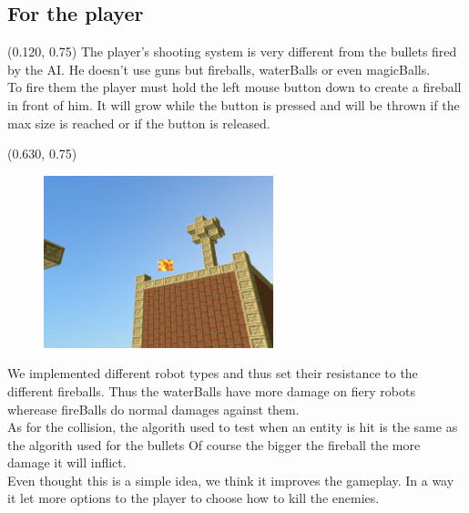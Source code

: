 \documentclass[article]{report}             %
\begin{document}
				\subsection{For the player}
				\begin{textblock}{0.508}(0.120, 0.75)
					The player's shooting system is very different from the bullets fired by the AI. He doesn't use guns but fireballs, waterBalls or even magicBalls. \\

					To fire them the player must hold the left mouse button down to create a fireball in front of him.
 				It will grow while the button is pressed and will be thrown if the max size is reached or if the button is released.\\
				\end{textblock}

				\begin{textblock}{0.628}(0.630, 0.75)
					\begin{figure}
						\includegraphics[height = 5cm]{images/Fireball.png}
					\end{figure}
				\end{textblock}
\newpage

					We implemented different robot types and thus set their resistance to the different fireballs. Thus the waterBalls have more damage on fiery robots wherease fireBalls do normal damages against them.\\

					As for the collision, the algorith used to test when an entity is hit is the same as the algorith used for the bullets Of course the bigger the fireball the more damage it will inflict.\\

					Even thought this is a simple idea, we think it improves the gameplay. In a way it let more options to the player to choose how to kill the enemies.
\end{document}
